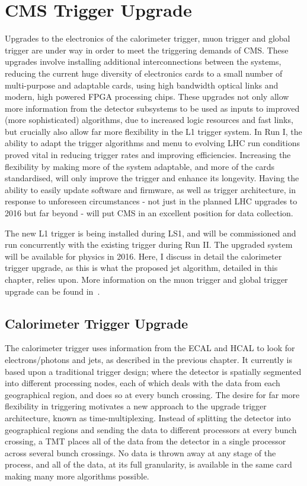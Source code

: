 \section{CMS Trigger Upgrade}
Upgrades to the electronics of the calorimeter trigger, muon trigger and global trigger are under way in order 
to meet the triggering demands of \ac{CMS}.
These upgrades involve installing additional interconnections between the systems, reducing the current huge diversity of electronics cards to a small number of multi-purpose and adaptable cards, using high bandwidth optical links and modern, high powered \ac{FPGA} processing chips. 
These upgrades not only allow more information from the detector subsystems to be used as inputs to improved (more sophisticated) algorithms, due to increased logic resources and fast links, 
but crucially also allow far more flexibility in the \ac{L1} trigger system. 
In Run I, the ability to adapt the trigger algorithms and menu to evolving \ac{LHC} run conditions proved vital in reducing trigger rates and improving efficiencies. 
Increasing the flexibility by making more of the system adaptable, and more of the cards standardised, will only improve the trigger and enhance its longevity. 
Having the ability to easily update software and firmware, as well as trigger architecture, in response to unforeseen circumstances - not just in the planned \ac{LHC} upgrades to 2016 but far beyond - will put \ac{CMS} in an excellent position for data collection.

The new \ac{L1} trigger is being installed during LS1, and will be commissioned and run concurrently with the existing trigger during Run II. 
The upgraded system will be available for physics in 2016.%
Here, I discuss in detail the calorimeter trigger upgrade, as this is what the proposed jet algorithm, detailed in this chapter, relies upon.
More information on the muon trigger and global trigger upgrade can be found in~\cite{Tapper:1556311}.



\subsection{Calorimeter Trigger Upgrade}
The calorimeter trigger uses information from the \ac{ECAL} and \ac{HCAL} to look for electrons/photons and jets, as described in the previous chapter.
It currently is based upon a traditional trigger design; where the detector is spatially segmented into different processing nodes, each of which deals with the data from each geographical region, and does so at every bunch crossing.
The desire for far more flexibility in triggering motivates a new approach to the upgrade trigger architecture, known as time-multiplexing.
Instead of splitting the detector into geographical regions and sending the data to different processors at every bunch crossing, 
a \ac{TMT} places all of the data from the detector in a single processor across several bunch crossings.
No data is thrown away at any stage of the process, and all of the data, at its full granularity, is available in the same card making many more algorithms possible.



